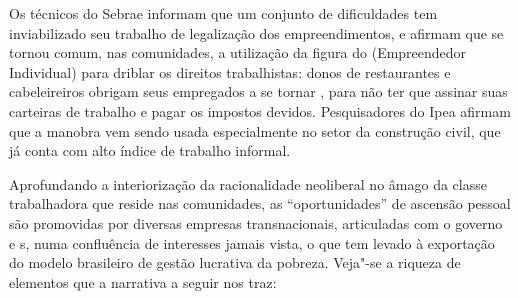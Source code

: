 Os técnicos do Sebrae informam que um conjunto de dificuldades tem
inviabilizado seu trabalho de legalização dos empreendimentos, e afirmam
que se tornou comum, nas comunidades, a utilização da figura do 
(Empreendedor Individual) para driblar os direitos trabalhistas: donos
de restaurantes e cabeleireiros obrigam seus empregados a se tornar ,
para não ter que assinar suas carteiras de trabalho e pagar os impostos
devidos. Pesquisadores do Ipea afirmam que a manobra vem sendo usada
especialmente no setor da construção civil, que já conta com alto índice
de trabalho informal.

Aprofundando a interiorização da racionalidade neoliberal no âmago da
classe trabalhadora que reside nas comunidades, as ``oportunidades'' de
ascensão pessoal são promovidas por diversas empresas transnacionais,
articuladas com o governo e s, numa confluência de interesses jamais
vista, o que tem levado à exportação do modelo brasileiro de gestão
lucrativa da pobreza. Veja"-se a riqueza de elementos que a narrativa a
seguir nos traz:

